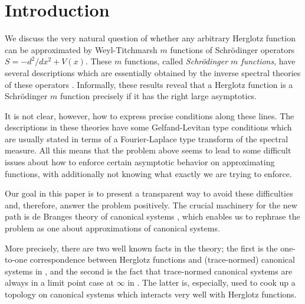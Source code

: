 \documentclass[preprint,12pt]{elsarticle}
\begin{document}

\section{Introduction}\label{secintro}





We discuss the very natural question of whether any arbitrary Herglotz function can be approximated by Weyl-Titchmarsh $m$ functions \cite{Titch,Weyl} of Schr\"odinger operators  $S=-d^2/dx^2+V(x)$. These $m$ functions, called \textit{Schr\"odinger $m$ functions}, have several descriptions which are essentially obtained by the inverse spectral theories of these operators \cite{Borg,GL, GS2,Hor,Lev,Mar1,Mar2,RSim,RemAf,RemdB,SimIST}. Informally, these results reveal that a Herglotz function is a Schr\"odinger $m$ function precisely if it has the right large asymptotics.

It is not clear, however, how to express precise conditions along these lines. The descriptions in these theories have some Gelfand-Levitan type conditions which are usually stated in terms of a Fourier-Laplace type transform of the spectral measure. All this means that the problem above seems to lead to some difficult issues about how to enforce certain asymptotic behavior on approximating functions, with additionally not knowing what exactly we are trying to enforce.

Our goal in this paper is to present a transparent way to avoid these difficulties and, therefore, answer the problem positively. The crucial machinery for the new path is de Branges theory of canonical systems \cite{Ach,deB1,deB2,deB3,deB4,deB,Dym,HSW,KL,RemdB,Sakh,Win,Win2}, which enables us to rephrase the problem as one about approximations of canonical systems. 

More precisely, there are two well known facts in the theory; the first is the one-to-one correspondence between Herglotz functions and (trace-normed) canonical systems in  \cite{deB,Win}, and the second is the fact that trace-normed canonical systems are always in a limit point case at $\infty$ in \cite{Ach,deB2}. The latter is, especially, used to cook up a topology on canonical systems which interacts very well with Herglotz functions. 
\end{document}

